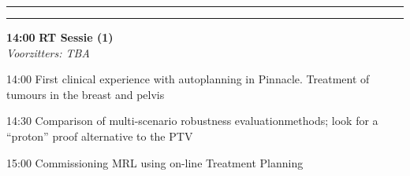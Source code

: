 \documentclass[a4paper,10pt]{report}
\begin{document}
\begin{multicols*}{3}




\vfill
\vspace{4cm}

\strut
\columnbreak

\hrule \vspace{2mm}
\vspace{2mm}\hrule\strut

\begin{packed_enum}
\item[\textbf{14:00}] \textbf{RT Sessie (1)}\\\textit{Voorzitters: TBA}
\item[14:00] First clinical experience with autoplanning in Pinnacle. Treatment of tumours in the breast and pelvis
\item[14:30] Comparison of multi-scenario robustness evaluationmethods; look for a ``proton'' proof alternative to the PTV
\item[15:00] Commissioning MRL using on-line Treatment Planning
\end{packed_enum} %

\vfill 


\end{multicols*}
\end{document}
